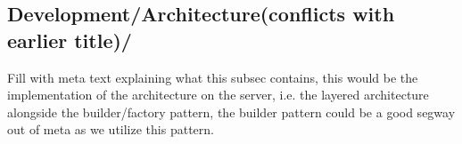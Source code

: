 \subsection{Development/Architecture(conflicts with earlier title)/}
Fill with meta text explaining what this subsec contains, this would be the implementation of the architecture on the server, i.e. the layered architecture alongside the builder/factory pattern, the builder pattern could be a good segway out of meta as we utilize this pattern.